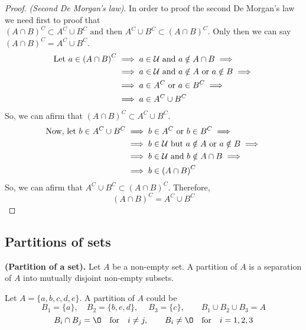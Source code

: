 \begin{proof}
    \textit{(Second De Morgan's law)}. In order to proof the second De Morgan's law we need first to proof that $\left( A\cap B \right)^C\subset A^C\cup B^C \textrm{ and then } A^C\cup B^C \subset \left(  A\cap B\right)^C$. Only then we can say $\left( A\cap B \right)^C = A^C\cup B^C $. 
    \begin{align}
        \textrm{Let } a\in\left( A\cap B \right)^C &\implies a\in\mathcal{U}\textrm{ and } a\notin A\cap B \implies \\
                                     &\implies a\in\mathcal{U}\textrm{ and } a\notin A\textrm{ or } a\notin B \implies \\ &\implies a\in A^C\textrm{ or } a\in B^C \implies \\
                                                         &\implies a\in A^C\cup B^C
    \end{align}
    So, we can afirm that $\left( A\cap B \right)^C \subset A^C\cup B^C $.
    \begin{align}
        \textrm{Now, let } b\in A^C\cup B^C &\implies b\in A^C\textrm{ or } b\in B^C \implies \\
                                            &\implies b\in\mathcal{U}\textrm{ but } a\notin A\textrm{ or } a\notin B \implies \\ &\implies b\in\mathcal{U}\textrm{ and } b\notin A\cap B \implies \\
                                            &\implies b\in \left( A\cap B \right)^C
    \end{align}
    So, we can afirm that $A^C\cup B^C\subset\left( A\cap B \right)^C $. Therefore,
    \begin{equation}
        \left( A\cap B \right)^C = A^C\cup B^C
    \end{equation}

\end{proof}

\subsection{Partitions of sets}
\begin{definition}
    \textbf{(Partition of a set).} Let $A$ be a non-empty set. A partition of $A$ is a separation of $A$ into mutually disjoint non-empty subsets.
\end{definition}
\begin{example}
    Let $A = \{a, b, c, d, e\} $. A partition of $A$ could be
    \begin{equation}
        B_1 = \{a\}, \quad B_2 = \{b, e, d\}, \quad\ B_3 = \{c\}, \quad\quad B_1\cup B_2\cup B_3 = A
    \end{equation}
    \begin{equation}
        B_i\cap B_j = \O\quad\textrm{for}\quad i\neq j,\quad\quad B_i\neq\O\quad\textrm{for}\quad i = 1, 2, 3
    \end{equation}
\end{example}

